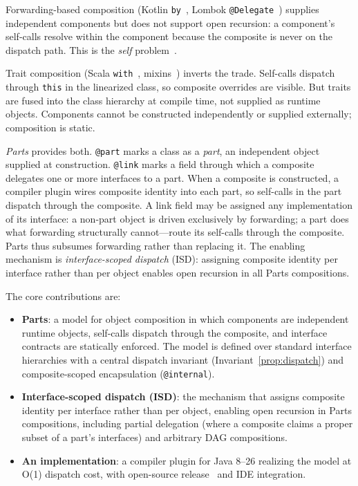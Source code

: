\documentclass[acmsmall,nonacm]{acmart}
\theoremstyle{acmplain}
\theoremstyle{acmdefinition}
\newcommand{\code}[1]{\texttt{#1}}
\begin{document}
Forwarding-based composition (Kotlin \code{by}~\cite{kotlin}, Lombok
\code{@Delegate}~\cite{lombok}) supplies independent components but does not
support open recursion: a component's self-calls resolve within the component
because the composite is never on the dispatch path. This is
the \emph{self} problem~\cite{lieberman1986,self1987}.

Trait composition (Scala \code{with}~\cite{odersky2005},
mixins~\cite{bracha1990}) inverts the trade. Self-calls dispatch through
\code{this} in the linearized class, so composite overrides are visible. But
traits are fused into the class hierarchy at compile time, not supplied as
runtime objects. Components cannot be constructed independently or supplied externally;
composition is static.

\emph{Parts} provides both. \code{@part} marks a class as a \emph{part}, an independent object supplied at construction. \code{@link} marks a field through which a composite
delegates one or more interfaces to a part. When a composite is constructed, a
compiler plugin wires composite identity into each part, so self-calls in
the part dispatch through the composite. A link field may be assigned any
implementation of its interface: a non-part object is driven exclusively by forwarding; a part does what forwarding structurally cannot---route
its self-calls through the composite. Parts thus subsumes forwarding rather than replacing
it. The enabling mechanism is
\emph{interface-scoped dispatch} (ISD): assigning composite identity per
interface rather than per object enables open recursion in all Parts compositions.

The core contributions are:

\begin{itemize}
  \item \textbf{Parts}: a model for object composition in which
        components are independent runtime objects, self-calls dispatch through
        the composite, and interface contracts are statically enforced.
        The model is defined over standard interface hierarchies with a central
        dispatch invariant (Invariant~\ref{prop:dispatch}) and
        composite-scoped encapsulation (\code{@internal}).
  \item \textbf{Interface-scoped dispatch (ISD)}: the mechanism that assigns
        composite identity per interface rather than per object, enabling
        open recursion in Parts compositions, including partial
        delegation (where a composite claims a proper subset of a part's
        interfaces) and arbitrary DAG compositions.
  \item \textbf{An implementation}: a compiler plugin for
        Java 8--26 realizing the model at O(1) dispatch cost, with open-source
        release~\cite{mckinney2026} and IDE integration.
\end{itemize}
\end{document}
